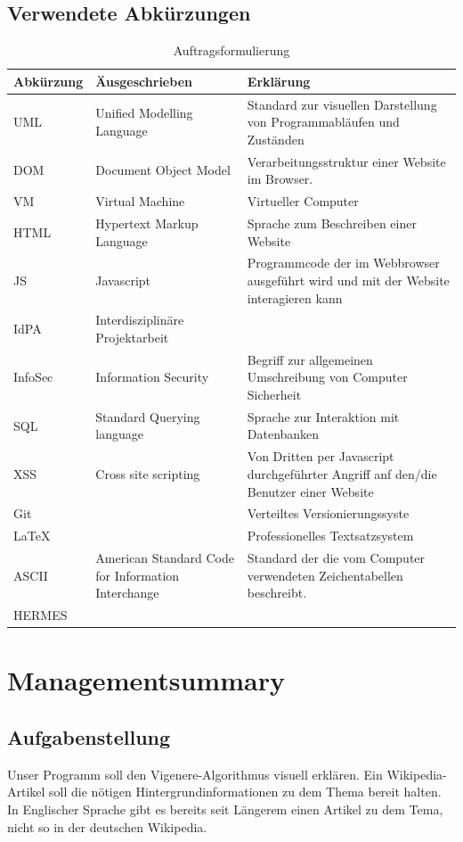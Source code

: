\documentclass[11pt,paper=a4,final]{scrartcl}
\begin{document}
\subsection{Verwendete Abk\"urzungen}
\begin{table}[h!]
  \centering
  \begin{tabularx}{\textwidth}{|l|p{6cm}|X|}\hline
    \bf Abk\"urzung & \bf \"Ausgeschrieben & \bf Erkl\"arung \\ \hline
    UML & Unified Modelling Language & Standard zur visuellen Darstellung von
    Programmabl\"aufen und Zust\"anden \\ \hline
    DOM & Document Object Model & Verarbeitungsstruktur einer Website im
    Browser. \\ \hline
    VM & Virtual Machine & Virtueller Computer \\ \hline
    HTML & Hypertext Markup Language & Sprache zum Beschreiben einer Website \\
    \hline
    JS & Javascript & Programmcode der im Webbrowser ausgef\"uhrt wird und mit
    der Website interagieren kann \\ \hline
    IdPA & Interdisziplin\"are Projektarbeit & \\ \hline
    InfoSec & Information Security & Begriff zur allgemeinen Umschreibung von
    Computer Sicherheit \\ \hline
    SQL & Standard Querying language & Sprache zur Interaktion mit Datenbanken
    \\ \hline
    XSS & Cross site scripting & Von Dritten per Javascript durchgef\"uhrter
    Angriff anf den/die Benutzer einer Website \\ \hline
    Git & & Verteiltes Versionierungssyste \\ \hline
    \LaTeX & & Professionelles Textsatzsystem \\ \hline
    ASCII & American Standard Code for Information Interchange &
    Standard der die vom Computer verwendeten Zeichentabellen beschreibt. \\
    \hline
    HERMES & & \\ \hline
  \end{tabularx}
  \caption{Auftragsformulierung}
  \label{tab:auftrag}
\end{table}

\tableofcontents
\section{Managementsummary}
\subsection{Aufgabenstellung}
Unser Programm soll den Vigenere-Algorithmus visuell erkl\"aren. Ein
Wikipedia-Artikel soll die n\"otigen Hintergrundinformationen zu dem Thema
bereit halten. In Englischer Sprache gibt es bereits seit L\"angerem einen
Artikel zu dem Tema, nicht so in der deutschen Wikipedia.
\end{document}
